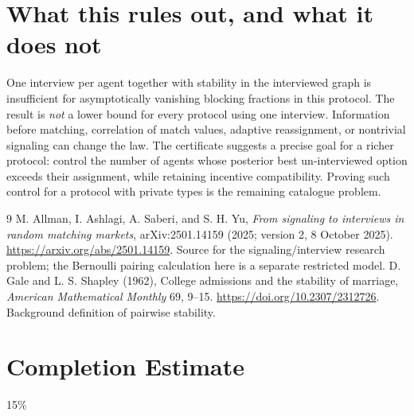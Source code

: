 \documentclass[11pt,a4paper]{article}
\theoremstyle{definition}
\theoremstyle{remark}
\begin{document}
\section{What this rules out, and what it does not}
One interview per agent together with stability in the interviewed graph is insufficient for asymptotically vanishing blocking fractions in this protocol. The result is \emph{not} a lower bound for every protocol using one interview. Information before matching, correlation of match values, adaptive reassignment, or nontrivial signaling can change the law. The certificate suggests a precise goal for a richer protocol: control the number of agents whose posterior best un-interviewed option exceeds their assignment, while retaining incentive compatibility. Proving such control for a protocol with private types is the remaining catalogue problem.
\begin{thebibliography}{9}
 M. Allman, I. Ashlagi, A. Saberi, and S. H. Yu, \emph{From signaling to interviews in random matching markets}, arXiv:2501.14159 (2025; version 2, 8 October 2025). \url{https://arxiv.org/abs/2501.14159}. Source for the signaling/interview research problem; the Bernoulli pairing calculation here is a separate restricted model.
 D. Gale and L. S. Shapley (1962), College admissions and the stability of marriage, \emph{American Mathematical Monthly} 69, 9--15. \url{https://doi.org/10.2307/2312726}. Background definition of pairwise stability.
\end{thebibliography}

\section{Completion Estimate}
15\%
\end{document}
